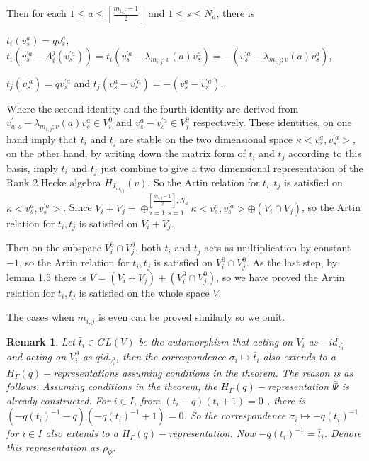 \def\CTEXPreproc{Created by ctex v0.2.12, don't edit!}\documentclass[11pt]{article}
\newtheorem{rem}{Remark}[section]
\begin{document}
\begin{pf}
 Then for each $1\leq a\leq [\frac{m_{i,j}-1}{2}]$ and $1\leq s\leq N_a $, there is

\noindent $t_i ( v^a _{s}  ) =q v^a _{s}$,
 $ t_i ( v^{' a}_{s} - A^j _i (v^{' a} _{s})   ) = t_i (v^{' a}_{s} -  \lambda _{m_{i,j};v} (a) v^a _{s} ) = -( v^{' a}_{s} -  \lambda _{m_{i,j};v} (a) v^a _{s} )    $,

\noindent $ t_j ( v^{' a} _{s}  )= q v^{' a}_{s} $ and
 $  t_j ( v^a _{s} - v^{' a} _{s}   )=- (   v^a _{s} - v^{' a} _{s}   )   $.


 Where the second identity and the fourth identity are derived  from $ v^{'}_{a;s} -  \lambda _{m_{i,j};v} (a) v^a _{s} \in V^0 _{i} $ and $  v^a _{s} - v^{' a} _{s} \in V^0 _j  $ respectively.  These identities, on  one hand imply that $t_i$ and $t_j$ are stable on the two dimensional space $\kappa < v^a _{s} , v^{' a}_{s} >$, on the other hand, by writing  down the matrix form of $t_i $ and $ t_j$ according to this basis, imply $t_i $ and $t_j $ just combine to give a two dimensional representation of the Rank 2 Hecke algebra $H_{I_{m_{i,j}}}(v)$. So the Artin relation for $t_i ,t_j$ is satisfied on $\kappa < v^a _{s} , v^{' a}_{s} > $.
  Since $V_i +V_j =  \oplus^{[\frac{m_{i,j}-1}{2}  ] , N_a} _{a=1,s=1}  \kappa < v^a _s , v^{' a}_s   >  \oplus (V_i \cap V_j) $,  so the Artin relation for $t_i , t_j$ is satisfied on $ V_i +V_j $.

   Then on the subspace $ V^0 _i \cap V^0 _j $, both $t_i $ and $t_j$ acts as multiplication by constant $-1$, so the Artin relation for $t_i ,t_j $ is satisfied on $ V^0 _i \cap V^0 _j $.  As the last step,  by lemma 1.5  there is  $V= (V_i + V_j) + ( V^0 _{i} \cap V^{0} _{j}  )   $, so we have proved the Artin relation for $t_i ,t_j$ is satisfied on the whole space $ V $.

   The cases when $m_{i,j}$ is even can be proved similarly so we omit.

 \begin{rem}
Let $\bar{t}_i \in GL( V )$ be the automorphism that acting on $V_i$ as $- id_{V_i }$ and acting on $V^0 _i$ as $q id_{V^0 _i }$, then the correspondence $\sigma_i \mapsto \bar{t}_i $ also extends to a $H_{\Gamma}(q)-$representations  assuming conditions in the theorem.  The reason is as follows. Assuming conditions in the theorem, the $H_{\Gamma}(q)-$representation $\bar{\Psi}$ is already constructed. For $i\in I$, from
$ ( t_i -q   )(t_i +1)=0  $ , there is $( -q (t_i )^{-1} -q  )( -q (t_i )^{-1} +1     )=0$. So the correspondence $\sigma_i \mapsto -q (t_i)^{-1} $ for $i\in I$ also extends to a $H_{\Gamma}(q)-$representation. Now $-q (t_i)^{-1}= \bar{t}_i$. Denote this representation as
$\bar{\rho}_{\Psi}$.

 \end{rem}


\end{pf}
\end{document}
